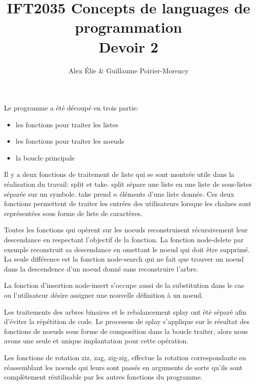 \documentclass{article}
\title{IFT2035 Concepts de languages de programmation \\ Devoir 2}
\author{Alex Élie \& Guillaume Poirier-Morency}
\begin{document}
  \maketitle

  \abstract

  \section{}
  Le programme a été découpé en trois partie:
  \begin{itemize}
    \item les fonctions pour traiter les listes
    \item les fonctions pour traiter les noeuds
    \item la boucle principale
  \end{itemize}

  Il y a deux fonctions de traitement de liste qui se sont montrée utile dans la
  réalisation du travail: \textsf{split} et \textsf{take}. \textsf{split} sépare
  une liste en une liste de sous-listes séparée sur un symbole. \textsf{take}
  prend $n$ éléments d'une liste donnée. Ces deux fonctions permettent de
  traiter les entrées des utilisateurs lorsque les chaînes sont représentées
  sous forme de liste de caractères.

  Toutes les fonctions qui opèrent sur les noeuds reconstruisent récursivement
  leur descendance en respectant l'objectif de la fonction. La fonction
  \textsf{node-delete} par exemple reconstruit sa descendance en omettant le
  noeud qui doit être supprimé. La seule différence est la fonction
  \textsf{node-search} qui ne fait que trouver un noeud dans la descendence d'un
  noeud donné sans reconstruire l'arbre.

  La fonction d'insertion \textsf{node-insert} s'occupe aussi de la substitution
  dans le cas ou l'utilisateur désire assigner une nouvelle définition à un
  noeud.

  Les traitements des arbres binaires et le rebalancement splay ont été séparé
  afin d'éviter la répétition de code. Le processus de splay s'applique sur le
  résultat des fonctions de noeuds sous forme de composition dans la boucle
  \textsf{traiter}, alors nous avons une seule et unique
  implantation pour cette opération.

  Les fonctions de rotation \textsf{ziz}, \textsf{zag}, \textsf{zig-zig},
  effectue la rotation correspondante en réassemblant les noeuds qui leurs sont
  passés en arguments de sorte qu'ils sont complètement réutilisable par les
  autres fonctions du programme.
\end{document}
